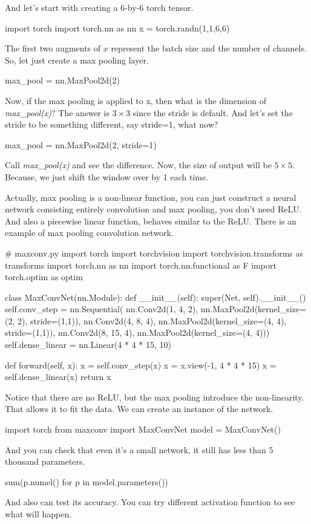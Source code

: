 And let's start with creating a 6-by-6 torch tensor.
\begin{python}
import torch
import torch.nn as nn
x = torch.randn(1,1,6,6)
\end{python}
The first two augments of $x$ represent the batch size and the number of channels.
So, let just create a max pooling layer. 
\begin{python}
max_pool = nn.MaxPool2d(2)
\end{python}
Now, if the max pooling is applied to x, then what is the dimension of \emph{max\_pool(x)}?
The answer is $3\times 3$ since the stride is default. And let's set the stride to be something different, say stride=1, what now?
\begin{python}
max_pool = nn.MaxPool2d(2, stride=1)
\end{python}
Call \emph{max\_pool(x)} and see the difference. Now, the size of output will be $5\times 5$. Because, we just shift the window over by 1 each time.

Actually, max pooling is a non-linear function, you can just construct a neural network consisting entirely convolution and max pooling, you don't need ReLU. And also a piecewise linear function, behaves similar to the ReLU. There is an example of max pooling convolution network.
\begin{python}
# maxconv.py
import torch 
import torchvision
import torchvision.transforms as transforms
import torch.nn as nn
import torch.nn.functional as F
import torch.optim as optim


class MaxConvNet(nn.Module):
    def __init__(self):
        super(Net, self).__init__()
        self.conv_step = nn.Sequential(
        nn.Conv2d(1, 4, 2),
        nn.MaxPool2d(kernel_size=(2, 2), stride=(1,1)),
        nn.Conv2d(4, 8, 4),
        nn.MaxPool2d(kernel_size=(4, 4), stride=(1,1)),
        nn.Conv2d(8, 15, 4),
        nn.MaxPool2d(kernel_size=(4, 4)))
        self.dense_linear = nn.Linear(4 * 4 * 15, 10)

    def forward(self, x):
        x = self.conv_step(x)
        x = x.view(-1, 4 * 4 * 15)
        x = self.dense_linear(x)
        return x
\end{python}
Notice that there are no ReLU, but the max pooling introduce the non-linearity. That allows it to fit the data. We can create an instance of the network. 
\begin{python}
import torch
from maxconv import MaxConvNet
model = MaxConvNet()
\end{python}
And you can check that even it's a small network, it still has less than 5 thousand parameters. 
\begin{python}
sum(p.numel() for p in model.parameters())
\end{python}
And also can test its accuracy. You can try different activation function to see what will happen.


